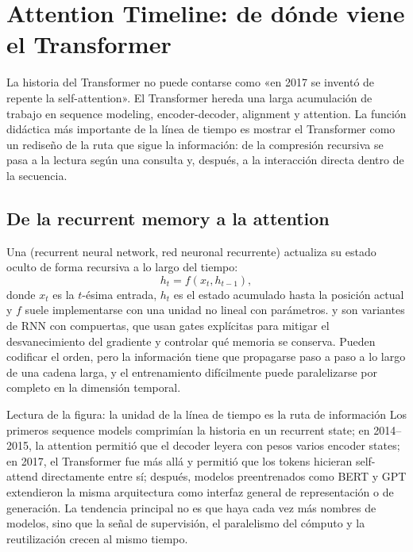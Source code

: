 \section{Attention Timeline: de dónde viene el Transformer}

La historia del Transformer no puede contarse como «en 2017 se inventó de repente la self-attention». El Transformer hereda una larga acumulación de trabajo en sequence modeling, encoder-decoder, alignment y attention. La función didáctica más importante de la línea de tiempo es mostrar el Transformer como un rediseño de la ruta que sigue la información: de la compresión recursiva se pasa a la lectura según una consulta y, después, a la interacción directa dentro de la secuencia.

\subsection{De la recurrent memory a la attention}

Una  (recurrent neural network, red neuronal recurrente) actualiza su estado oculto de forma recursiva a lo largo del tiempo:
\[
h_t = f(x_t,h_{t-1}),
\]
donde $x_t$ es la $t$-ésima entrada, $h_t$ es el estado acumulado hasta la posición actual y $f$ suele implementarse con una unidad no lineal con parámetros.  y  son variantes de RNN con compuertas, que usan gates explícitas para mitigar el desvanecimiento del gradiente y controlar qué memoria se conserva. Pueden codificar el orden, pero la información tiene que propagarse paso a paso a lo largo de una cadena larga, y el entrenamiento difícilmente puede paralelizarse por completo en la dimensión temporal.


\begin{knowledgebox}{Lectura de la figura: la unidad de la línea de tiempo es la ruta de información}
Los primeros sequence models comprimían la historia en un recurrent state; en 2014--2015, la attention permitió que el decoder leyera con pesos varios encoder states; en 2017, el Transformer fue más allá y permitió que los tokens hicieran self-attend directamente entre sí; después, modelos preentrenados como BERT y GPT extendieron la misma arquitectura como interfaz general de representación o de generación. La tendencia principal no es que haya cada vez más nombres de modelos, sino que la señal de supervisión, el paralelismo del cómputo y la reutilización crecen al mismo tiempo.
\end{knowledgebox}

